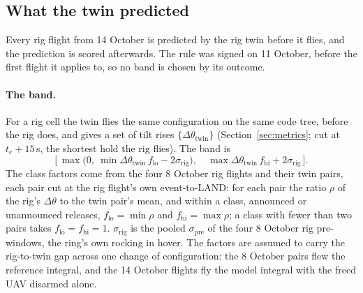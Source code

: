 
\subsection{What the twin predicted}
\label{sec:ledger}

Every rig flight from 14 October is predicted by the rig twin before it flies, and the prediction is scored
afterwards. The rule was signed on 11 October, before the first flight it applies to, so no band is chosen by
its outcome.

\paragraph{The band.} For a rig cell the twin flies the same configuration on the same code tree, before the
rig does, and gives a set of tilt rises $\{\Delta\theta_{\mathrm{twin}}\}$ (Section~\ref{sec:metrics}; cut at
$t_e+15$\,s, the shortest hold the rig flies). The band is
\begin{equation}
  \Big[\,\max\big(0,\ \min\Delta\theta_{\mathrm{twin}}\,f_{\mathrm{lo}}-2\sigma_{\mathrm{rig}}\big),\quad
  \max\Delta\theta_{\mathrm{twin}}\,f_{\mathrm{hi}}+2\sigma_{\mathrm{rig}}\,\Big].
  \label{eq:band}
\end{equation}
The class factors come from the four 8 October rig flights and their twin pairs, each pair cut at the rig
flight's own event-to-LAND: for each pair the ratio $\rho$ of the rig's $\Delta\theta$ to the twin pair's
mean, and within a class, announced or unannounced releases, $f_{\mathrm{lo}}=\min\rho$ and
$f_{\mathrm{hi}}=\max\rho$; a class with fewer than two pairs takes $f_{\mathrm{lo}}=f_{\mathrm{hi}}=1$.
$\sigma_{\mathrm{rig}}$ is the pooled $\sigma_{\mathrm{pre}}$ of the four 8 October rig pre-windows, the
ring's own rocking in hover. The factors are assumed to carry the rig-to-twin gap across one change of
configuration: the 8 October pairs flew the reference integral, and the 14 October flights fly the model
integral with the freed UAV disarmed alone.

